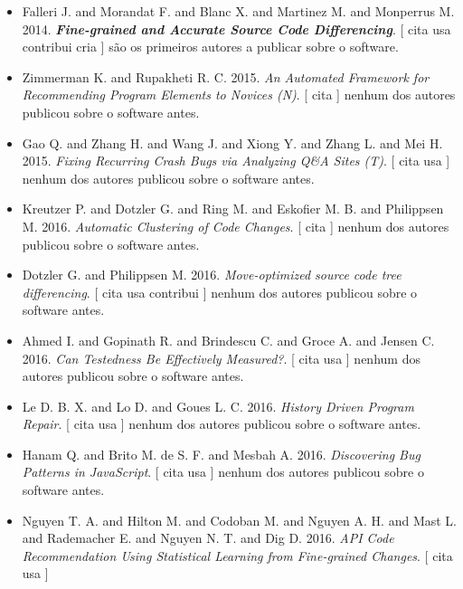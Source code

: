 \begin{itemize}
\item Falleri J. and Morandat F. and Blanc X. and Martinez M. and Monperrus M.
      2014.
        \textbf{\textit{ Fine-grained and Accurate Source Code Differencing}}.
      [
          cita
          usa
          contribui
          cria
      ]
são os primeiros autores a publicar sobre o software.
\item Zimmerman K. and Rupakheti R. C.
      2015.
        \textit{ An Automated Framework for Recommending Program Elements to Novices (N)}.
      [
          cita
      ]
nenhum dos autores publicou sobre o software antes.
\item Gao Q. and Zhang H. and Wang J. and Xiong Y. and Zhang L. and Mei H.
      2015.
        \textit{ Fixing Recurring Crash Bugs via Analyzing Q\&A Sites (T)}.
      [
          cita
          usa
      ]
nenhum dos autores publicou sobre o software antes.
\item Kreutzer P. and Dotzler G. and Ring M. and Eskofier M. B. and Philippsen M.
      2016.
        \textit{ Automatic Clustering of Code Changes}.
      [
          cita
      ]
nenhum dos autores publicou sobre o software antes.
\item Dotzler G. and Philippsen M.
      2016.
        \textit{ Move-optimized source code tree differencing}.
      [
          cita
          usa
          contribui
      ]
nenhum dos autores publicou sobre o software antes.
\item Ahmed I. and Gopinath R. and Brindescu C. and Groce A. and Jensen C.
      2016.
        \textit{ Can Testedness Be Effectively Measured?}.
      [
          cita
          usa
      ]
nenhum dos autores publicou sobre o software antes.
\item Le D. B. X. and Lo D. and Goues L. C.
      2016.
        \textit{ History Driven Program Repair}.
      [
          cita
          usa
      ]
nenhum dos autores publicou sobre o software antes.
\item Hanam Q. and Brito M. de S. F. and Mesbah A.
      2016.
        \textit{ Discovering Bug Patterns in JavaScript}.
      [
          cita
          usa
      ]
nenhum dos autores publicou sobre o software antes.
\item Nguyen T. A. and Hilton M. and Codoban M. and Nguyen A. H. and Mast L. and Rademacher E. and Nguyen N. T. and Dig D.
      2016.
        \textit{ API Code Recommendation Using Statistical Learning from Fine-grained Changes}.
      [
          cita
          usa
      ]

\end{itemize}

